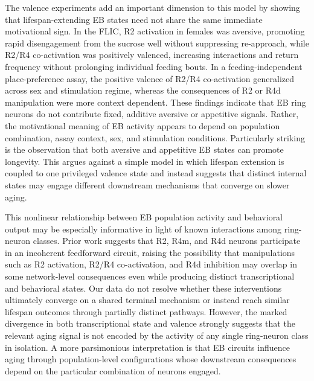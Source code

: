 The valence experiments add an important dimension to this model by showing that lifespan-extending EB states need not share the same immediate motivational sign. In the FLIC, R2 activation in females was aversive, promoting rapid disengagement from the sucrose well without suppressing re-approach, while R2/R4 co-activation was positively valenced, increasing interactions and return frequency without prolonging individual feeding bouts. In a feeding-independent place-preference assay, the positive valence of R2/R4 co-activation generalized across sex and stimulation regime, whereas the consequences of R2 or R4d manipulation were more context dependent. These findings indicate that EB ring neurons do not contribute fixed, additive aversive or appetitive signals. Rather, the motivational meaning of EB activity appears to depend on population combination, assay context, sex, and stimulation conditions. Particularly striking is the observation that both aversive and appetitive EB states can promote longevity. This argues against a simple model in which lifespan extension is coupled to one privileged valence state and instead suggests that distinct internal states may engage different downstream mechanisms that converge on slower aging.

This nonlinear relationship between EB population activity and behavioral output may be especially informative in light of known interactions among ring-neuron classes. Prior work suggests that R2, R4m, and R4d neurons participate in an incoherent feedforward circuit, raising the possibility that manipulations such as R2 activation, R2/R4 co-activation, and R4d inhibition may overlap in some network-level consequences even while producing distinct transcriptional and behavioral states. Our data do not resolve whether these interventions ultimately converge on a shared terminal mechanism or instead reach similar lifespan outcomes through partially distinct pathways. However, the marked divergence in both transcriptional state and valence strongly suggests that the relevant aging signal is not encoded by the activity of any single ring-neuron class in isolation. A more parsimonious interpretation is that EB circuits influence aging through population-level configurations whose downstream consequences depend on the particular combination of neurons engaged.

